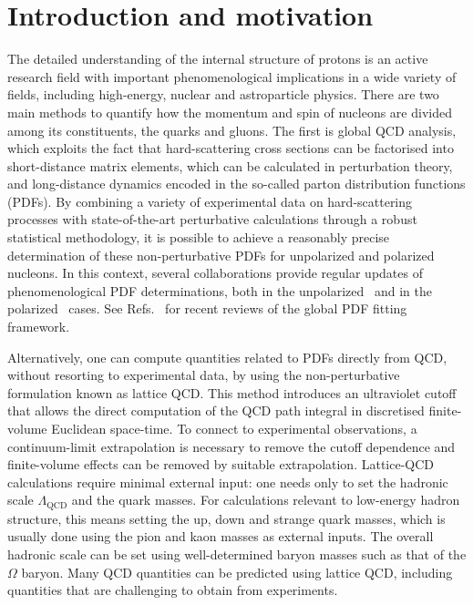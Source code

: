 \section{Introduction and motivation}

The detailed understanding of the internal structure of protons is an active
research field with important phenomenological implications in a wide variety of fields,
including high-energy, nuclear and astroparticle physics.
%
There are two main methods to quantify how the momentum and spin of nucleons
are divided among its constituents, the quarks and gluons.
%
The first is global QCD analysis, which exploits the fact that hard-scattering
cross sections can be factorised into short-distance matrix elements, which can
be calculated in perturbation theory, and long-distance dynamics encoded in the
so-called parton distribution functions (PDFs).
%
By combining a variety of experimental data on hard-scattering processes
with state-of-the-art perturbative calculations through a robust statistical
methodology, it is possible to achieve a reasonably precise determination
of these non-perturbative PDFs for unpolarized and polarized nucleons.
%
In this context, several collaborations provide regular updates of
phenomenological PDF determinations, both
in the unpolarized~\cite{Ball:2012cx,Ball:2014uwa,Harland-Lang:2014zoa,
Dulat:2015mca,Alekhin:2017kpj,Owens:2012bv} and in
the polarized~\cite{Nocera:2014gqa,deFlorian:2009vb} cases.
%
See Refs.~\cite{Rojo:2015acz,Butterworth:2015oua,Ball:2012wy,
Alekhin:2011sk,Forte:2013wc,Forte:2010dt,Perez:2012um,DeRoeck:2011na,
Accardi:2016ndt} for recent reviews of the global PDF fitting framework.

Alternatively, one can compute quantities related to PDFs directly 
from QCD, without resorting to
experimental data, by using the non-perturbative formulation known as lattice QCD.
%
This method introduces an ultraviolet cutoff that allows the direct 
computation of the QCD path integral in discretised finite-volume 
Euclidean space-time. To connect to experimental observations, a 
continuum-limit extrapolation is necessary to remove the cutoff dependence 
and finite-volume effects can be removed by suitable extrapolation.
%
Lattice-QCD calculations require minimal external input: one needs only to 
set the hadronic scale $\Lambda_\text{QCD}$ and the quark masses. 
For calculations relevant to low-energy hadron structure, this means
setting the up, down and strange quark masses,
which is usually done using the pion and kaon masses as external inputs.
%
The overall hadronic scale can be set using well-determined baryon masses 
such as that of the $\Omega$ baryon.
%
Many QCD quantities can be predicted 
using lattice QCD, including quantities that are challenging to obtain from experiments. 

